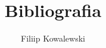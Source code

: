 \documentclass[a4paper,12pt]{article}
\begin{document}
\title{Bibliografia}
\author{Filiip Kowalewski}
\maketitle




\end{document}
